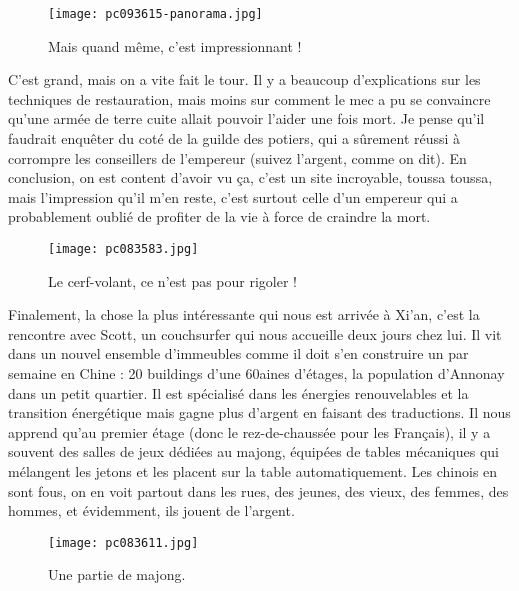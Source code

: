 \documentclass{book}
\begin{document}
\begin{figure}[h]
\centering
\texttt{[image: pc093615-panorama.jpg]}
\caption*{Mais quand même, c'est impressionnant !}
\end{figure}

C'est grand, mais on a vite fait le tour. Il y a beaucoup d'explications sur les techniques de restauration, mais moins sur comment le mec a pu se convaincre qu'une armée de terre cuite allait pouvoir l'aider une fois mort. Je pense qu'il faudrait enquêter du coté de la guilde des potiers, qui a sûrement réussi à corrompre les conseillers de l'empereur (suivez l'argent, comme on dit).
En conclusion, on est content d'avoir vu ça, c'est un site incroyable, toussa toussa, mais l'impression qu'il m'en reste, c'est surtout celle d'un empereur qui a probablement oublié de profiter de la vie à force de craindre la mort.


\begin{figure}[h]
\centering
\texttt{[image: pc083583.jpg]}
\caption*{Le cerf-volant, ce n'est pas pour rigoler !}
\end{figure}

Finalement, la chose la plus intéressante qui nous est arrivée à Xi'an, c'est la rencontre avec Scott, un couchsurfer qui nous accueille deux jours chez lui. Il vit dans un nouvel ensemble d'immeubles comme il doit s'en construire un par semaine en Chine : 20 buildings d'une 60aines d'étages, la population d'Annonay dans un petit quartier. Il est spécialisé dans les énergies renouvelables et la transition énergétique mais gagne plus d'argent en faisant des traductions. Il nous apprend qu'au premier étage (donc le rez-de-chaussée pour les Français), il y a souvent des salles de jeux dédiées au majong, équipées de tables mécaniques qui mélangent les jetons et les placent sur la table automatiquement. Les chinois en sont fous, on en voit partout dans les rues, des jeunes, des vieux, des femmes, des hommes, et évidemment, ils jouent de l'argent.


\begin{figure}[h]
\centering
\texttt{[image: pc083611.jpg]}
\caption*{Une partie de majong.}
\end{figure}
\end{document}
